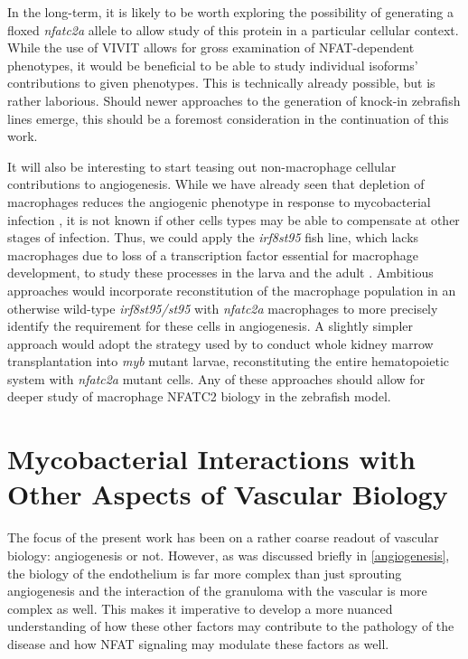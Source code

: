 In the long-term, it is likely to be worth exploring the possibility of generating a floxed \textit{nfatc2a} allele to allow study of this protein in a particular cellular context. While the use of VIVIT allows for gross examination of NFAT-dependent phenotypes, it would be beneficial to be able to study individual isoforms' contributions to given phenotypes. This is technically already possible, but is rather laborious. Should newer approaches to the generation of knock-in zebrafish lines emerge, this should be a foremost consideration in the continuation of this work.

It will also be interesting to start teasing out non-macrophage cellular contributions to angiogenesis. While we have already seen that depletion of macrophages reduces the angiogenic phenotype in response to mycobacterial infection \citep{Oehlers2015}, it is not known if other cells types may be able to compensate at other stages of infection. Thus, we could apply the \textit{irf8\textit{st95}} fish line, which lacks macrophages due to loss of a transcription factor essential for macrophage development, to study these processes in the larva and the adult \citep{Shiau2015, Xu2012, Tamura2005}. Ambitious approaches would incorporate reconstitution of the macrophage population in an otherwise wild-type \textit{irf8\textit{st95/st95}} with \textit{nfatc2a} macrophages to more precisely identify the requirement for these cells in angiogenesis. A slightly simpler approach would adopt the strategy used by \citet{Cronan2021} to conduct whole kidney marrow transplantation into \textit{myb} mutant larvae, reconstituting the entire hematopoietic system with \textit{nfatc2a} mutant cells. Any of these approaches should allow for deeper study of macrophage NFATC2 biology in the zebrafish model.

\section{Mycobacterial Interactions with Other Aspects of Vascular Biology}

The focus of the present work has been on a rather coarse readout of vascular biology: angiogenesis or not. However, as was discussed briefly in \autoref{angiogenesis}, the biology of the endothelium is far more complex than just sprouting angiogenesis and the interaction of the granuloma with the vascular is more complex as well. This makes it imperative to develop a more nuanced understanding of how these other factors may contribute to the pathology of the disease and how NFAT signaling may modulate these factors as well. 

